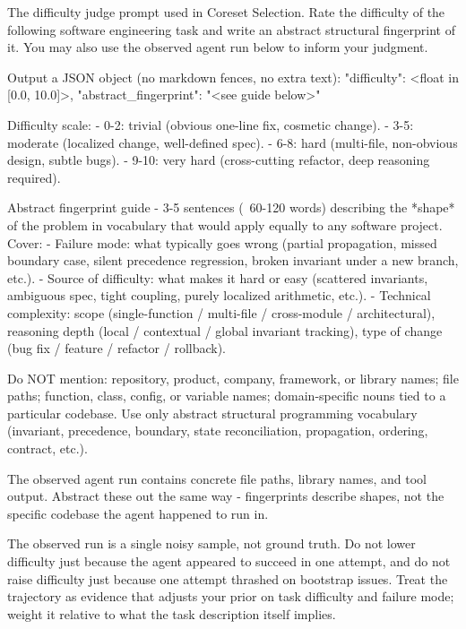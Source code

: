 \documentclass{llmxive}
\begin{document}
\begin{promptbox}{The difficulty judge prompt used in Coreset Selection.}
Rate the difficulty of the following software engineering task and write
an abstract structural fingerprint of it. You may also use the observed
agent run below to inform your judgment.

Output a JSON object (no markdown fences, no extra text):
{
  "difficulty": <float in [0.0, 10.0]>,
  "abstract_fingerprint": "<see guide below>"
}

Difficulty scale:
- 0-2: trivial (obvious one-line fix, cosmetic change).
- 3-5: moderate (localized change, well-defined spec).
- 6-8: hard (multi-file, non-obvious design, subtle bugs).
- 9-10: very hard (cross-cutting refactor, deep reasoning required).

Abstract fingerprint guide - 3-5 sentences (~60-120 words) describing
the *shape* of the problem in vocabulary that would apply equally to
any software project. Cover:
- Failure mode: what typically goes wrong (partial propagation,
  missed boundary case, silent precedence regression, broken invariant
  under a new branch, etc.).
- Source of difficulty: what makes it hard or easy (scattered
  invariants, ambiguous spec, tight coupling, purely localized
  arithmetic, etc.).
- Technical complexity: scope (single-function / multi-file /
  cross-module / architectural), reasoning depth (local / contextual /
  global invariant tracking), type of change (bug fix / feature /
  refactor / rollback).

Do NOT mention: repository, product, company, framework, or library
names; file paths; function, class, config, or variable names;
domain-specific nouns tied to a particular codebase. Use only abstract
structural programming vocabulary (invariant, precedence, boundary,
state reconciliation, propagation, ordering, contract, etc.).

The observed agent run contains concrete file paths, library names, and
tool output. Abstract these out the same way - fingerprints describe
shapes, not the specific codebase the agent happened to run in.

The observed run is a single noisy sample, not ground truth. Do not
lower difficulty just because the agent appeared to succeed in one
attempt, and do not raise difficulty just because one attempt thrashed
on bootstrap issues. Treat the trajectory as evidence that adjusts your
prior on task difficulty and failure mode; weight it relative to what
the task description itself implies.


\end{promptbox}
\end{document}
